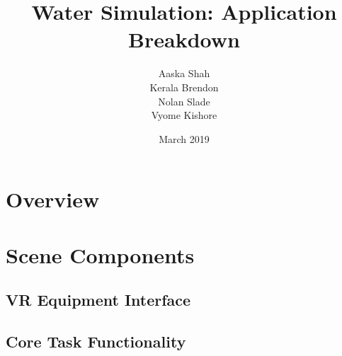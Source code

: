 \documentclass{article}
\title{Water Simulation: Application Breakdown}
\author{Aaska Shah\\Kerala Brendon\\Nolan Slade\\Vyome Kishore}
\date{March 2019}
\begin{document}
\maketitle


\section*{Overview}

\section*{Scene Components}
\subsection*{VR Equipment Interface} %



\subsection*{Core Task Functionality} %
\end{document}
